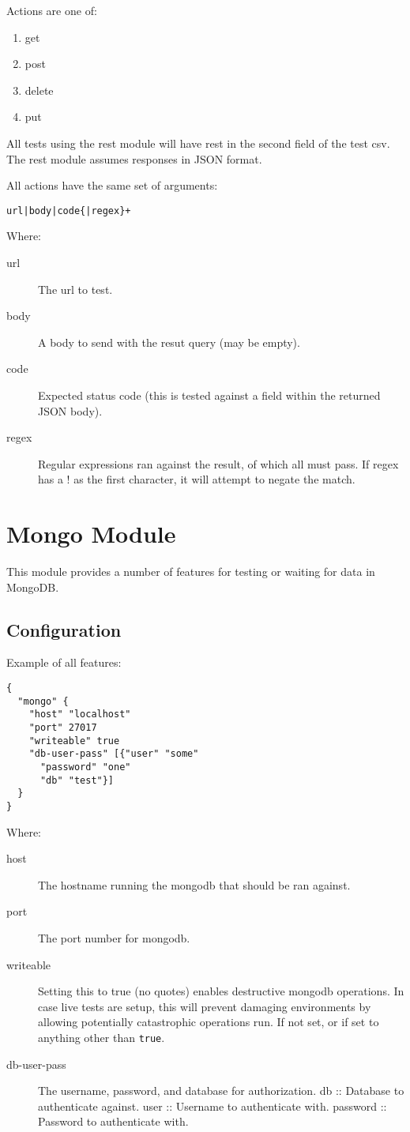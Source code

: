 \documentclass[12pt,a4paper,koma]{article}
\begin{document}
Actions are one of:
\begin{enumerate}
\item get
\item post
\item delete
\item put
\end{enumerate}

All tests using the rest module will have rest in the second field of the
test csv. The rest module assumes responses in JSON format.

All actions have the same set of arguments:
\begin{verbatim}
url|body|code{|regex}+
\end{verbatim}

Where:
\begin{description}
\item[{url}] The url to test.
\item[{body}] A body to send with the resut query (may be empty).
\item[{code}] Expected status code (this is tested against a field within the
returned JSON body).
\item[{regex}] Regular expressions ran against the result, of which all must pass.
If regex has a ! as the first character, it will attempt to negate the match.
\end{description}
\section{Mongo Module}
\label{sec-3}
This module provides a number of features for testing or waiting for data
in MongoDB.

\subsection{Configuration}
\label{sec-3-1}
Example of all features:
\begin{verbatim}
{
  "mongo" {
    "host" "localhost"
    "port" 27017
    "writeable" true
    "db-user-pass" [{"user" "some"
      "password" "one"
      "db" "test"}]
  }
}
\end{verbatim}
Where:
\begin{description}
\item[{host}] The hostname running the mongodb that should be ran against.
\item[{port}] The port number for mongodb.
\item[{writeable}] Setting this to true (no quotes) enables destructive mongodb
operations. In case live tests are setup, this will prevent damaging
environments by allowing potentially catastrophic operations run. If
not set, or if set to anything other than \verb~true~.
\item[{db-user-pass}] The username, password, and database for authorization.
db :: Database to authenticate against.
user :: Username to authenticate with.
password :: Password to authenticate with.
\end{description}
\end{document}
